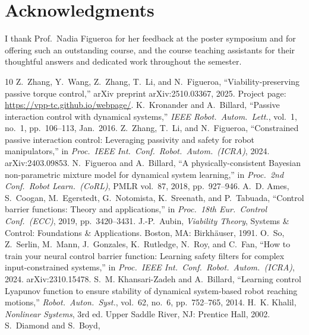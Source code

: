 \documentclass[10pt,conference]{IEEEtran}
\theoremstyle{remark}
\theoremstyle{plain}
\begin{document}
\section*{Acknowledgments}
I thank Prof.\ Nadia Figueroa for her feedback at the poster
symposium and for offering such an outstanding course, and the
course teaching assistants for their thoughtful answers and
dedicated work throughout the semester.


\begin{thebibliography}{10}
 Z.~Zhang, Y.~Wang, Z.~Zhang, T.~Li, and N.~Figueroa,
``Viability-preserving passive torque control,''
arXiv preprint arXiv:2510.03367, 2025. Project page:
\url{https://vpp-tc.github.io/webpage/}.
 K.~Kronander and A.~Billard,
``Passive interaction control with dynamical systems,''
\textit{IEEE Robot.\ Autom.\ Lett.}, vol.~1, no.~1, pp.~106--113, Jan.\ 2016.
 Z.~Zhang, T.~Li, and N.~Figueroa,
``Constrained passive interaction control: Leveraging passivity
and safety for robot manipulators,''
in \textit{Proc.\ IEEE Int.\ Conf.\ Robot.\ Autom.\ (ICRA)}, 2024.
arXiv:2403.09853.
 N.~Figueroa and A.~Billard,
``A physically-consistent Bayesian non-parametric mixture model
for dynamical system learning,''
in \textit{Proc.\ 2nd Conf.\ Robot Learn.\ (CoRL)},
PMLR vol.~87, 2018, pp.~927--946.
 A.~D. Ames, S.~Coogan, M.~Egerstedt,
G.~Notomista, K.~Sreenath, and P.~Tabuada,
``Control barrier functions: Theory and applications,''
in \textit{Proc.\ 18th Eur.\ Control Conf.\ (ECC)}, 2019,
pp.~3420--3431.
 J.-P.\ Aubin,
\textit{Viability Theory}, Systems \& Control: Foundations \&
Applications. Boston, MA: Birkh\"auser, 1991.
 O.~So, Z.~Serlin, M.~Mann, J.~Gonzales,
K.~Rutledge, N.~Roy, and C.~Fan,
``How to train your neural control barrier function: Learning
safety filters for complex input-constrained systems,''
in \textit{Proc.\ IEEE Int.\ Conf.\ Robot.\ Autom.\ (ICRA)}, 2024.
arXiv:2310.15478.
 S.~M. Khansari-Zadeh and A.~Billard,
``Learning control Lyapunov function to ensure stability of
dynamical system-based robot reaching motions,''
\textit{Robot.\ Auton.\ Syst.}, vol.~62, no.~6, pp.~752--765, 2014.
 H.~K. Khalil,
\textit{Nonlinear Systems}, 3rd ed.
Upper Saddle River, NJ: Prentice Hall, 2002.
 S.~Diamond and S.~Boyd,

\end{thebibliography}
\end{document}
